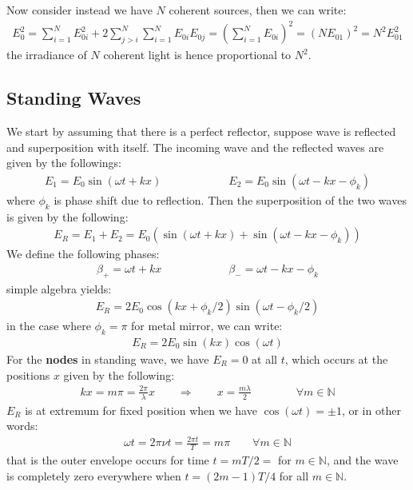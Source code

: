 \documentclass[11pt]{book}
\theoremstyle{break}
\theoremstyle{break}
\newcommand{\N}{\mathbb{N}}
\begin{document}
Now consider instead we have $N$ coherent sources, then we can write:
\begin{align*}
E_0^2 = \sum_{i=1}^N E_{0i}^2 + 2\sum_{j>i}^N \sum_{i=1}^N E_{0i}E_{0j} = \left( \sum_{i=1}^N E_{0i}\right)^2 = (NE_{01})^2 = N^2 E_{01}^2
\end{align*}
the irradiance of $N$ coherent light is hence proportional to $N^2$. 

\subsection{Standing Waves}
We start by assuming that there is a perfect reflector, suppose wave is reflected and superposition with itself. The incoming wave and the reflected waves are given by the followings:
\begin{align*}
E_1 = E_0 \sin(\omega t+ kx) \qquad\qquad\qquad E_2 = E_0 \sin(\omega t- kx - \phi_k)
\end{align*}
where $\phi_k$ is phase shift due to reflection. Then the superposition of the two waves is given by the following:
\begin{align*}
E_R = E_1 + E_2 = E_0 \left( \sin( \omega t+ kx) + \sin(\omega t - kx - \phi_k)\right)
\end{align*}
We define the following phases:
\begin{align*}
\beta_+ = \omega t + kx \qquad\qquad\qquad \beta_- = \omega t -kx -\phi_k
\end{align*}
simple algebra yields:
\begin{align*}
E_R = 2E_0 \cos(kx + \phi_k/2) \sin(\omega t - \phi_k / 2)
\end{align*}
in the case where $\phi_k = \pi$ for metal mirror, we can write:
\begin{align*}
E_R = 2E_0 \sin(kx) \cos(\omega t) \tag{If $\phi_k = \pi$}
\end{align*}
For the \textbf{nodes} in standing wave, we have $E_R = 0$ at all $t$, which occurs at the positions $x$ given by the following:
\begin{align*}
kx = m\pi = \frac{2\pi}{\lambda}x \qquad\Rightarrow\qquad
x = \frac{m \lambda}{2} \qquad\qquad \forall m \in \N
\end{align*}
$E_R$ is at extremum for fixed position when we have $\cos(\omega t) = \pm 1$, or in other words:
\begin{align*}
\omega t = 2\pi \nu t = \frac{2\pi t}{T} = m \pi \qquad \forall m \in \N
\end{align*}
that is the outer envelope occurs for time $t = mT/2 = $ for $m\in \N$, and the wave is completely zero everywhere when $t = (2m-1)T/4$ for all $m \in \N$.\\
\end{document}

